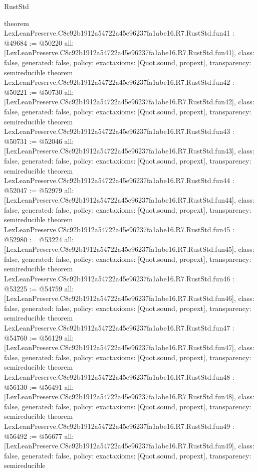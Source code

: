 \begin{lexlean}{RustStd}
\begin{coremodule}
{}
theorem LexLeanPreserve.C8c92b1912a54722a45e96237fa1abe16.R7.RustStd.fun41 : @49684 := @50220 {
  all: [LexLeanPreserve.C8c92b1912a54722a45e96237fa1abe16.R7.RustStd.fun41],
  class: false,
  generated: false,
  policy: exact{axioms: [Quot.sound, propext]},
  transparency: semireducible
}
theorem LexLeanPreserve.C8c92b1912a54722a45e96237fa1abe16.R7.RustStd.fun42 : @50221 := @50730 {
  all: [LexLeanPreserve.C8c92b1912a54722a45e96237fa1abe16.R7.RustStd.fun42],
  class: false,
  generated: false,
  policy: exact{axioms: [Quot.sound, propext]},
  transparency: semireducible
}
theorem LexLeanPreserve.C8c92b1912a54722a45e96237fa1abe16.R7.RustStd.fun43 : @50731 := @52046 {
  all: [LexLeanPreserve.C8c92b1912a54722a45e96237fa1abe16.R7.RustStd.fun43],
  class: false,
  generated: false,
  policy: exact{axioms: [Quot.sound, propext]},
  transparency: semireducible
}
theorem LexLeanPreserve.C8c92b1912a54722a45e96237fa1abe16.R7.RustStd.fun44 : @52047 := @52979 {
  all: [LexLeanPreserve.C8c92b1912a54722a45e96237fa1abe16.R7.RustStd.fun44],
  class: false,
  generated: false,
  policy: exact{axioms: [Quot.sound, propext]},
  transparency: semireducible
}
theorem LexLeanPreserve.C8c92b1912a54722a45e96237fa1abe16.R7.RustStd.fun45 : @52980 := @53224 {
  all: [LexLeanPreserve.C8c92b1912a54722a45e96237fa1abe16.R7.RustStd.fun45],
  class: false,
  generated: false,
  policy: exact{axioms: [Quot.sound, propext]},
  transparency: semireducible
}
theorem LexLeanPreserve.C8c92b1912a54722a45e96237fa1abe16.R7.RustStd.fun46 : @53225 := @54759 {
  all: [LexLeanPreserve.C8c92b1912a54722a45e96237fa1abe16.R7.RustStd.fun46],
  class: false,
  generated: false,
  policy: exact{axioms: [Quot.sound, propext]},
  transparency: semireducible
}
theorem LexLeanPreserve.C8c92b1912a54722a45e96237fa1abe16.R7.RustStd.fun47 : @54760 := @56129 {
  all: [LexLeanPreserve.C8c92b1912a54722a45e96237fa1abe16.R7.RustStd.fun47],
  class: false,
  generated: false,
  policy: exact{axioms: [Quot.sound, propext]},
  transparency: semireducible
}
theorem LexLeanPreserve.C8c92b1912a54722a45e96237fa1abe16.R7.RustStd.fun48 : @56130 := @56491 {
  all: [LexLeanPreserve.C8c92b1912a54722a45e96237fa1abe16.R7.RustStd.fun48],
  class: false,
  generated: false,
  policy: exact{axioms: [Quot.sound, propext]},
  transparency: semireducible
}
theorem LexLeanPreserve.C8c92b1912a54722a45e96237fa1abe16.R7.RustStd.fun49 : @56492 := @56677 {
  all: [LexLeanPreserve.C8c92b1912a54722a45e96237fa1abe16.R7.RustStd.fun49],
  class: false,
  generated: false,
  policy: exact{axioms: [Quot.sound, propext]},
  transparency: semireducible
}
\end{coremodule}
\end{lexlean}
